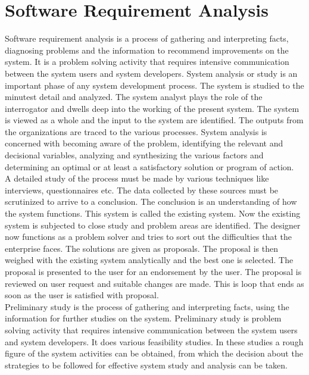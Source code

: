 \section{Software Requirement Analysis}

Software requirement analysis is a process of gathering and interpreting facts, diagnosing problems and the information to recommend improvements on the system. It is a problem solving activity that requires intensive communication between the system users and system developers. System analysis or study is an important phase of any system development process. The system is studied to the minutest detail and analyzed. The system analyst plays the role of the interrogator and dwells deep into the working of the present system. The system is viewed as a whole and the input to the system are identified. The outputs from the organizations are traced to the various processes. System analysis is concerned with becoming aware of the problem, identifying the relevant and decisional variables, analyzing and synthesizing the various factors and determining an optimal or at least a satisfactory solution or program of action.\\

\noindent A detailed study of the process must be made by various techniques like interviews, questionnaires etc. The data collected by these sources must be scrutinized to arrive to a conclusion. The conclusion is an understanding of how the system functions. This system is called the existing system. Now the existing system is subjected to close study and problem areas are identified. The designer now functions as a problem solver and tries to sort out the difficulties that the enterprise faces. The solutions are given as proposals. The proposal is then weighed with the existing system analytically and the best one is selected. The proposal is presented to the user for an endorsement by the user. The proposal is reviewed on user request and suitable changes are made. This is loop that ends as soon as the user is satisfied with proposal.\\

\noindent Preliminary study is the process of gathering and interpreting facts, using the information for further studies on the system. Preliminary study is problem solving activity that requires intensive communication between the system users and system developers. It does various feasibility studies. In these studies a rough figure of the system activities can be obtained, from which the decision about the strategies to be followed for effective system study and analysis can be taken.
